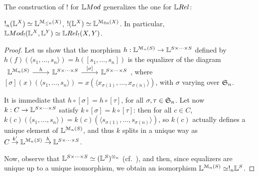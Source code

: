%
%
The construction of $!$ for $\Mod$ generalizes the one for $\LREL$:
\begin{proposition}\label{prop:pinv3}
$!_{n}(\mathbb{L}^{X})\simeq \mathbb{L}^{\mathcal{M}_{\leq n}(X)}$, $!(\mathbb{L}^{X})\simeq \mathbb{L}^{\mathcal{M}_{\mathrm{fin}}(X)}$. In particular, $\Mod_{!}(\Lawv^{X},\Lawv^{Y})\simeq \LREL_{!}(X,Y)$.
\end{proposition}
\begin{proof}
Let us show that the morphism $h:\mathbb{L}^{\mathcal{M}_{n}(S)}\to \mathbb{L}^{S\times \dots \times S}$ defined by 
$
h(f)(\langle s_{1},\dots, s_{n}\rangle)=h([s_{1},\dots, s_{n}])
$
is the equalizer of the diagram 
$
\begin{tikzcd}
\Lawv^{\C M_{n}(S)} \ar{r}{h} &\Lawv^{S\times \dots \times S}\ar{r}{[\sigma]} &
\Lawv^{S\times \dots \times S}
\end{tikzcd}
$, 
where $[\sigma](x)(\langle s_{1},\dots, s_{n}\rangle)=x(\langle x_{\sigma(1)},\dots, x_{\sigma(n)}\rangle)$, with $\sigma$ varying over $\mathfrak{S}_{n}$.

It is immediate that $h\circ [\sigma]=h\circ [\tau]$, for all $\sigma,\tau\in \mathfrak{S}_{n}$. Let now $k: C\to \mathbb{L}^{S\times \dots \times S}$ satisfy $k\circ [\sigma]=k\circ [\tau]$: then for all $c\in C$, $k(c)(\langle s_{1},\dots, s_{n}\rangle)=k(c)(\langle s_{\sigma(1)},\dots, s_{\sigma(n)}\rangle)$, so $k(c)$ actually defines a unique element of $\mathbb{L}^{\mathcal{M}_{n}(S)}$, and thus $k$ splits in a unique way as $C \stackrel{k'}{\to} \mathbb{L}^{\mathcal{M}_{n}(S)} \stackrel{h}{\to}\mathbb{L}^{S\times \dots \times S}$.

Now, observe that 
$\mathbb{L}^{S\times \dots \times S}\simeq (\mathbb{L}^{S})^{\otimes_{n}}$ (cf.~\cite[Corollary 4.7.12 ($iii$)]{Russo2007}), and then, since equalizers are unique up to a unique isomorphism, we obtain an isomorphism $\mathbb{L}^{\mathcal{M}_{n}(S)}\simeq !_{n}\mathbb{L}^{S}$.
%
%
\end{proof}




